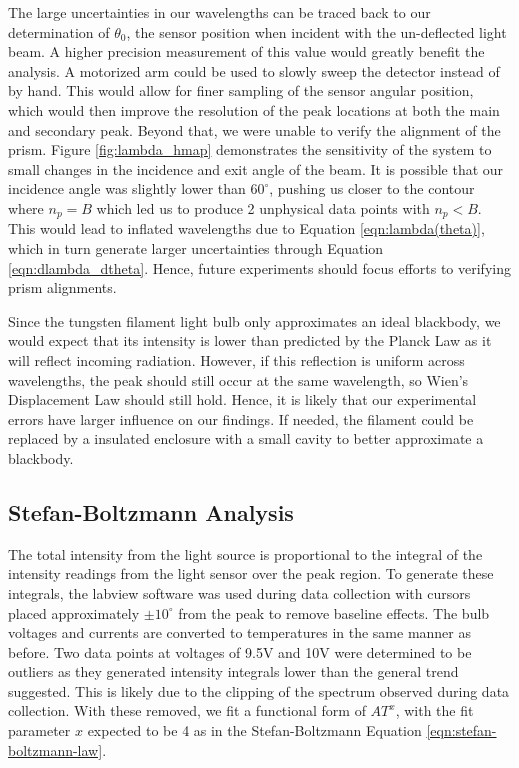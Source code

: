 \documentclass[
	a4paper, %
	10pt, %
	twoside, %
]{journal}
\begin{document}
The large uncertainties in our wavelengths can be traced back to our determination of $\theta_0$, the sensor position when incident with the un-deflected light beam. A higher precision measurement of this value would greatly benefit the analysis. A motorized arm could be used to slowly sweep the detector instead of by hand. This would allow for finer sampling of the sensor angular position, which would then improve the resolution of the peak locations at both the main and secondary peak. Beyond that, we were unable to verify the alignment of the prism. Figure \ref{fig:lambda_hmap} demonstrates the sensitivity of the system to small changes in the incidence and exit angle of the beam. It is possible that our incidence angle was slightly lower than $60^\circ$, pushing us closer to the contour where $n_p = B$ which led us to produce 2 unphysical data points with $n_p < B$. This would lead to inflated wavelengths due to Equation \ref{eqn:lambda(theta)}, which in turn generate larger uncertainties through Equation \ref{eqn:dlambda_dtheta}. Hence, future experiments should focus efforts to verifying prism alignments.

Since the tungsten filament light bulb only approximates an ideal blackbody, we would expect that its intensity is lower than predicted by the Planck Law as it will reflect incoming radiation. However, if this reflection is uniform across wavelengths, the peak should still occur at the same wavelength, so Wien's Displacement Law should still hold. Hence, it is likely that our experimental errors have larger influence on our findings. If needed, the filament could be replaced by a insulated enclosure with a small cavity to better approximate a blackbody. 

\subsection{Stefan-Boltzmann Analysis}
The total intensity from the light source is proportional to the integral of the intensity readings from the light sensor over the peak region. To generate these integrals, the labview software was used during data collection with cursors placed approximately $\pm 10^\circ$ from the peak to remove baseline effects. The bulb voltages and currents are converted to temperatures in the same manner as before. Two data points at voltages of 9.5V and 10V were determined to be outliers as they generated intensity integrals lower than the general trend suggested. This is likely due to the clipping of the spectrum observed during data collection. With these removed, we fit a functional form of $AT^x$, with the fit parameter $x$ expected to be 4 as in the Stefan-Boltzmann Equation \ref{eqn:stefan-boltzmann-law}. 
\end{document}
